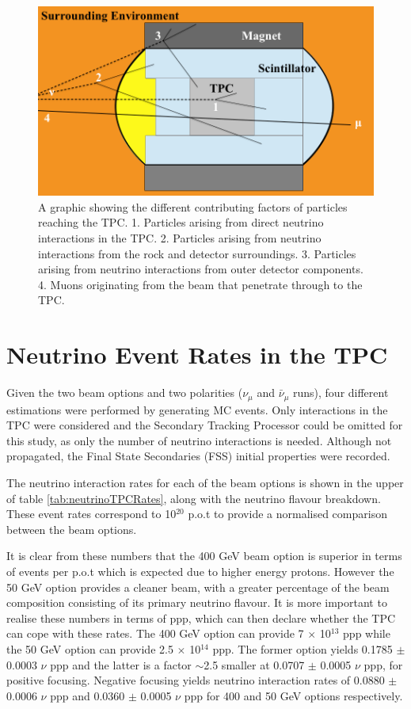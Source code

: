 \begin{figure}[hbtp]
\begin{center}
  \includegraphics[width=120mm]{Chapter4/figures/particleInteractions.png}
  \caption{A graphic showing the different contributing factors of particles reaching the TPC. 1. Particles arising from direct neutrino interactions in the TPC. 2. Particles arising from neutrino interactions from the rock and detector surroundings. 3. Particles arising from neutrino interactions from outer detector components. 4. Muons originating from the beam that penetrate through to the TPC.}
  \label{fig:particleBackgrounds}
\end{center}
\end{figure}

\section{Neutrino Event Rates in the TPC}
Given the two beam options and two polarities ($\nu_{\mu}$ and $\bar{\nu}_{\mu}$ runs), four different estimations were performed by generating MC events. Only interactions in the TPC were considered and the Secondary Tracking Processor could be omitted for this study, as only the number of neutrino interactions is needed. Although not propagated, the Final State Secondaries (FSS) initial properties were recorded. 

The neutrino interaction rates for each of the beam options is shown in the upper of table \ref{tab:neutrinoTPCRates}, along with the neutrino flavour breakdown. These event rates correspond to 10$^{20}$ p.o.t to provide a normalised comparison between the beam options. 

It is clear from these numbers that the 400 GeV beam option is superior in terms of events per p.o.t which is expected due to higher energy protons. However the 50 GeV option provides a cleaner beam, with a greater percentage of the beam composition consisting of its primary neutrino flavour. It is more important to realise these numbers in terms of ppp, which can then declare whether the TPC can cope with these rates. The 400 GeV option can provide 7 $\times$ 10$^{13}$ ppp while the 50 GeV option can provide 2.5 $\times$ 10$^{14}$ ppp. The former option yields 0.1785 $\pm$ 0.0003 $\nu$ ppp and the latter is a factor $\sim$2.5 smaller at 0.0707 $\pm$ 0.0005 $\nu$ ppp, for positive focusing. Negative focusing yields neutrino interaction rates of 0.0880 $\pm$ 0.0006 $\nu$ ppp and 0.0360 $\pm$ 0.0005 $\nu$ ppp for 400 and 50 GeV options respectively.

